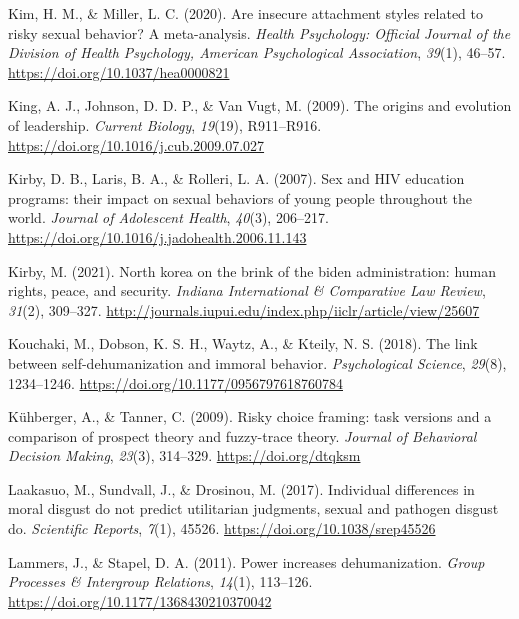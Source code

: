 \documentclass[
  donotrepeattitle,doc, 12pt, a4paper,floatsintext]{apa7}
\newlength{\cslhangindent}
\newlength{\cslentryspacingunit} %
\newenvironment{CSLReferences}[2] %
 {%
  \setlength{\parindent}{0pt}
  \ifodd #1
  \let\oldpar\par
  \def\par{\hangindent=\cslhangindent\oldpar}
  \fi
  \setlength{\parskip}{#2\cslentryspacingunit}
 }%
 {}
\begin{document}
\begin{CSLReferences}{1}{0}
\leavevmode{}%
Kim, H. M., \& Miller, L. C. (2020). Are insecure attachment styles related to risky sexual behavior? A meta-analysis. \emph{Health Psychology: Official Journal of the Division of Health Psychology, American Psychological Association}, \emph{39}(1), 46--57. \url{https://doi.org/10.1037/hea0000821}

\leavevmode{}%
King, A. J., Johnson, D. D. P., \& Van Vugt, M. (2009). The origins and evolution of leadership. \emph{Current Biology}, \emph{19}(19), R911--R916. \url{https://doi.org/10.1016/j.cub.2009.07.027}

\leavevmode{}%
Kirby, D. B., Laris, B. A., \& Rolleri, L. A. (2007). Sex and HIV education programs: their impact on sexual behaviors of young people throughout the world. \emph{Journal of Adolescent Health}, \emph{40}(3), 206--217. \url{https://doi.org/10.1016/j.jadohealth.2006.11.143}

\leavevmode{}%
Kirby, M. (2021). North korea on the brink of the biden administration: human rights, peace, and security. \emph{Indiana International \& Comparative Law Review}, \emph{31}(2), 309--327. \url{http://journals.iupui.edu/index.php/iiclr/article/view/25607}

\leavevmode{}%
Kouchaki, M., Dobson, K. S. H., Waytz, A., \& Kteily, N. S. (2018). The link between self-dehumanization and immoral behavior. \emph{Psychological Science}, \emph{29}(8), 1234--1246. \url{https://doi.org/10.1177/0956797618760784}

\leavevmode{}%
Kühberger, A., \& Tanner, C. (2009). Risky choice framing: task versions and a comparison of prospect theory and fuzzy-trace theory. \emph{Journal of Behavioral Decision Making}, \emph{23}(3), 314--329. \url{https://doi.org/dtqksm}

\leavevmode{}%
Laakasuo, M., Sundvall, J., \& Drosinou, M. (2017). Individual differences in moral disgust do not predict utilitarian judgments, sexual and pathogen disgust do. \emph{Scientific Reports}, \emph{7}(1), 45526. \url{https://doi.org/10.1038/srep45526}

\leavevmode{}%
Lammers, J., \& Stapel, D. A. (2011). Power increases dehumanization. \emph{Group Processes \& Intergroup Relations}, \emph{14}(1), 113--126. \url{https://doi.org/10.1177/1368430210370042}


\end{CSLReferences}
\end{document}
